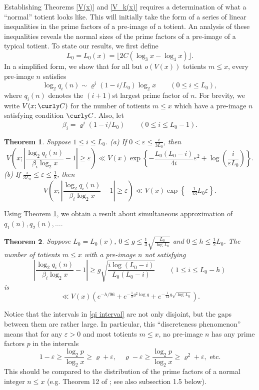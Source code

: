\documentclass[11pt]{amsart}
\theoremstyle{remark}
\theoremstyle{plain}
\newtheorem{thm}{Theorem}
\numberwithin{equation}{section}
\newcommand{\be}{\begin{equation}}
\newcommand{\ee}{\end{equation}}
\renewcommand{\b}{\ensuremath{\beta}}
\newcommand{\eps}{\ensuremath{\varepsilon}}
\renewcommand{\(}{\left(}
\renewcommand{\)}{\right)}
\newcommand{\pfrac}[2]{\left(\frac{#1}{#2}\right)}
\newcommand{\fancyC}{{\curly C}}
\renewcommand{\le}{\leqslant}
\renewcommand{\ge}{\geqslant}
\renewcommand{\rho}{\varrho}
\begin{document}
Establishing Theorems \ref{V(x)} and \ref{V_k(x)} requires a
determination of what a ``normal''
totient looks like.  This will initially take the form of
a series of linear inequalities in the prime factors of a pre-image of
a totient.  An analysis of these inequalities reveals the normal
sizes of the prime factors of a pre-image of a typical totient.
To state our results, we first define
\be\label{L_0}
L_0 = L_0(x) = \lfloor 2C(\log_3 x - \log_4 x) \rfloor. 
\ee
In a simplified form, we show that for
all but $o(V(x))$ totients $m\le x$, every pre-image $n$ satisfies
\be\label{NS}
\log_2 q_i(n) \sim \rho^i(1-i/L_0) \log_2 x \qquad (0\le i\le L_0),
\ee
where $q_i(n)$ denotes the $(i+1)$st largest prime factor of $n$.
For brevity, we write $V(x;\fancyC)$ for the number of totients $m\le x$
which have a pre-image $n$ satisfying condition $\fancyC$.  Also, let
\[
\b_i = \rho^i (1-i/L_0) \qquad (0\le i\le L_0-1).
\]

\begin{thm}\label{qi normal}
Suppose $1\le i\le L_0$.  (a) If $0 < \eps \le \frac{i}{3L_0}$, then
\[
 V\( x; \left| \frac{\log_2 q_i(n)}{\b_i\log_2 x} - 1 \right| \ge \eps \) 
\ll V(x) \exp \left\{ - \frac{L_0(L_0-i)}{4i} \eps^2 + \log\pfrac{i}{\eps L_0} \right\}.
\]
(b) If $ \frac{i}{3L_0} \le \eps \le \frac18$, then
\[
 V\( x; \left| \frac{\log_2 q_i(n)}{\b_i\log_2 x} - 1 \right| \ge \eps \) 
\ll V(x) \exp \left\{ - \tfrac1{13} L_0 \eps \right\}.
\]
\end{thm}

Using Theorem \ref{qi normal}, we obtain a result about simultaneous approximation of 
$q_1(n), q_2(n), \ldots$.

\begin{thm}\label{normal structure}
Suppose $L_0=L_0(x)$, $0\le g \le \frac13 \sqrt{\frac{L_0}{\log L_0}}$ and 
$0\le h\le \frac12 L_0$.
The number of totients $m\le x$ with a pre-image $n$ not satisfying
\be\label{qi interval}
\left| \frac{\log_2 q_i(n)}{\b_i\log_2 x} - 1 \right| \ge  
g \sqrt{\frac{i \log(L_0-i)}{L_0(L_0-i)}} \qquad
(1 \le i \le L_0 - h)
\ee
 is
$$
\ll V(x) \( e^{-h/96} + e^{-\frac12 g^2\log g} + e^{-\frac{1}{14} g\sqrt{\log L_0}} \).
$$
\end{thm}

 Notice that the intervals
in \eqref{qi interval} are not only disjoint, but the gaps between them are
rather large.  In particular, this ``discreteness phenomenon'' means
 that for any $\eps>0$ and most totients  $m\le x$, no pre-image $n$ has any prime factors
$p$ in the intervals
$$
1-\eps \ge \frac{\log_2 p}{\log_2 x} \ge \rho+\eps, \quad \rho-\eps \ge \frac{\log_2 p}
{\log_2 x} \ge \rho^2+\eps, \text{ etc.}
$$
This should be compared to the distribution of the prime factors of a
normal integer $n\le x$ (e.g. Theorem 12 of \cite{HaT}; see also subsection 1.5 below).
\end{document}
